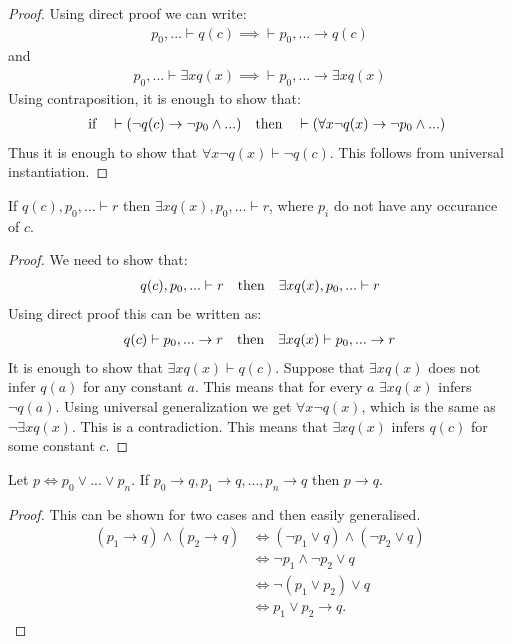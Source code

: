\begin{proof}
  Using direct proof we can write: 
  \begin{align*}
    p_0,... \vdash q(c) \implies \vdash p_0,... \to q(c)
  \end{align*}
  and
  \begin{align*} 
    p_0,... \vdash \exists x q(x) \implies \vdash p_0,... \to \exists xq(x)
  \end{align*}
  Using contraposition, it is enough to show that:
  \begin{align*}
    \qq{if} \vdash (\lnot q(c) \to \lnot p_0 \land ...) \qq{then} \vdash (\forall x\lnot  q(x) \to \lnot p_0 \land ...)
  \end{align*}
  Thus it is enough to show that $\forall x\lnot q(x) \vdash \lnot q(c)$. This follows from universal instantiation.
\end{proof}
\begin{proposition}
  If $q(c), p_0,... \vdash r$ then $\exists x q(x), p_0,... \vdash r$, where $p_i$ do not have any occurance of $c$.
\end{proposition}
\begin{proof}
  We need to show that:
\begin{align*}
  q(c), p_0,... \vdash r \qq{then} \exists x q(x), p_0,... \vdash r
\end{align*}
Using direct proof this can be written as:
\begin{align*}
  q(c)  \vdash p_0,...\to r \qq{then} \exists x q(x)\vdash p_0,...\to r
\end{align*}
 It is enough to show that $\exists x q(x) \vdash q(c)$. Suppose that $\exists x q(x)$ does not infer $q(a)$ for any constant $a$. This means that for every $a$ $\exists x q(x)$ infers $\lnot q(a)$. Using universal generalization we get $\forall x \lnot q(x)$, which is the same as $\lnot \exists x q(x)$. This is a contradiction. This means that $\exists xq(x)$ infers $q(c)$ for some constant $c$.
\end{proof}
\begin{proposition}
  Let $p \iff  p_0 \lor ... \lor p_n$. If $p_0 \to q, p_1 \to q,..., p_n \to q$ then $p \to q$.
\end{proposition}
\begin{proof}
  This can be shown for two cases and then easily generalised.
  \begin{align*}
    (p_1 \to q) \land (p_2 \to q) &\iff (\lnot p_1 \lor q) \land (\lnot p_2 \lor q)\\
                        &\iff \lnot p_1 \land \lnot p_2 \lor q\\
                        &\iff \lnot (p_1 \lor p_2) \lor q\\
                        &\iff p_1 \lor p_2 \to q.
  \end{align*}
\end{proof}
